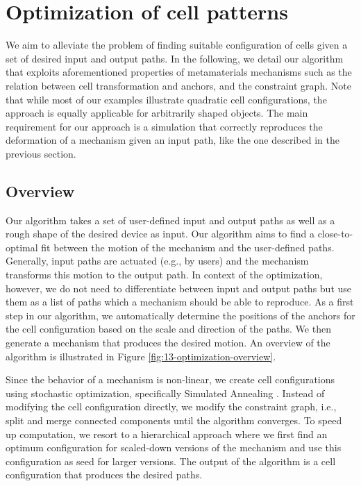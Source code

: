 \section{Optimization of cell patterns}
\label{section:optimization}

We aim to alleviate the problem of finding suitable configuration of cells given a set of desired input and output paths. In the following, we detail our algorithm that exploits aforementioned properties of metamaterials mechanisms such as the relation between cell transformation and anchors, and the constraint graph. Note that while most of our examples illustrate quadratic cell configurations, the approach is equally applicable for arbitrarily shaped objects. The main requirement for our approach is a simulation that correctly reproduces the deformation of a mechanism given an input path, like the one described in the previous section.

\subsection{Overview}

Our algorithm takes a set of user-defined input and output paths as well as a rough shape of the desired device as input. Our algorithm aims to find a close-to-optimal fit between the motion of the mechanism and the user-defined paths. Generally, input paths are actuated (e.g., by users) and the mechanism transforms this motion to the output path. In context of the optimization, however, we do not need to differentiate between input and output paths but use them as a list of paths which a mechanism should be able to reproduce. As a first step in our algorithm, we automatically determine the positions of the anchors for the cell configuration based on the scale and direction of the paths. We then generate a mechanism that produces the desired motion. An overview of the algorithm is illustrated in Figure \ref{fig:13-optimization-overview}.

Since the behavior of a mechanism is non-linear, we create cell configurations using stochastic optimization, specifically Simulated Annealing \cite{Ram1996, Kirkpatrick1983}. Instead of modifying the cell configuration directly, we modify the constraint graph, i.e., split and merge connected components until the algorithm converges. To speed up computation, we resort to a hierarchical approach where we first find an optimum configuration for scaled-down versions of the mechanism and use this configuration as seed for larger versions. The output of the algorithm is a cell configuration that produces the desired paths.

